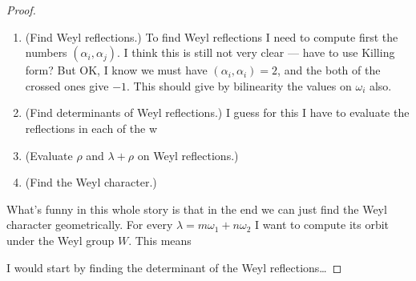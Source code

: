 \begin{proof}
\begin{enumerate}
\item (Find Weyl reflections.) To find Weyl reflections I need to compute
first the numbers $(\alpha_i, \alpha_j)$. I think this is still not
very clear --- have to use Killing form? But OK, I know we must have
$(\alpha_i,\alpha_i)=2$, and the both of the crossed ones give $-1$.
This should give by bilinearity the values on $\omega_i$ also.

\item (Find determinants of Weyl reflections.) I guess for this
I have to evaluate the reflections in each of the w

\item (Evaluate $\rho$ and $\lambda+\rho$ on Weyl reflections.)

\item (Find the Weyl character.)
\end{enumerate}

What's funny in this whole story is that
in the end we can just find the Weyl character geometrically.
For every $\lambda=m \omega_1+n \omega_2$
I want to compute its orbit under the Weyl group $W$.
This means 


I would start by finding the determinant 
of the Weyl reflections…
\end{proof}






